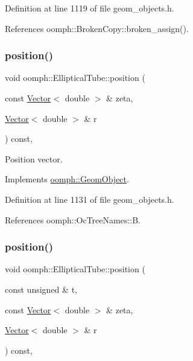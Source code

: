 Definition at line 1119 of file geom\+\_\+objects.\+h.



References oomph\+::\+Broken\+Copy\+::broken\+\_\+assign().

\mbox{\label{classoomph_1_1EllipticalTube_af7a879adbdba6f7fc1a1dd9c0b9378f6}} 
\subsubsection{\texorpdfstring{position()}{position()}\hspace{0.1cm}{\footnotesize\ttfamily [1/2]}}
{\footnotesize\ttfamily void oomph\+::\+Elliptical\+Tube\+::position (\begin{DoxyParamCaption}\item[{const \hyperlink{classoomph_1_1Vector}{Vector}$<$ double $>$ \&}]{zeta,  }\item[{\hyperlink{classoomph_1_1Vector}{Vector}$<$ double $>$ \&}]{r }\end{DoxyParamCaption}) const\hspace{0.3cm}{\ttfamily [inline]}, {\ttfamily [virtual]}}



Position vector. 



Implements \hyperlink{classoomph_1_1GeomObject_a0d04c9d4667817f3ef24bb660fd56065}{oomph\+::\+Geom\+Object}.



Definition at line 1131 of file geom\+\_\+objects.\+h.



References oomph\+::\+Oc\+Tree\+Names\+::B.

\mbox{\label{classoomph_1_1EllipticalTube_a01c6372a901d28892cab9e43ba8b3530}} 
\subsubsection{\texorpdfstring{position()}{position()}\hspace{0.1cm}{\footnotesize\ttfamily [2/2]}}
{\footnotesize\ttfamily void oomph\+::\+Elliptical\+Tube\+::position (\begin{DoxyParamCaption}\item[{const unsigned \&}]{t,  }\item[{const \hyperlink{classoomph_1_1Vector}{Vector}$<$ double $>$ \&}]{zeta,  }\item[{\hyperlink{classoomph_1_1Vector}{Vector}$<$ double $>$ \&}]{r }\end{DoxyParamCaption}) const\hspace{0.3cm}{\ttfamily [inline]}, {\ttfamily [virtual]}}



